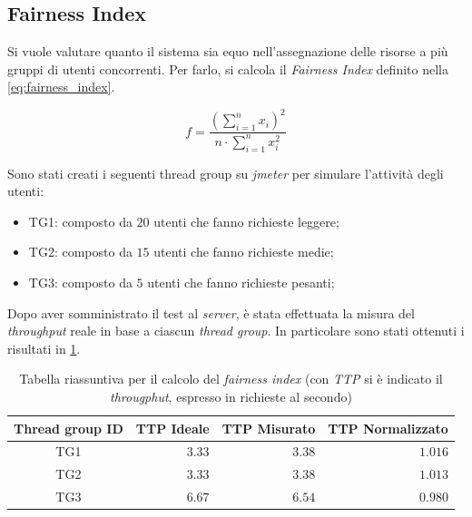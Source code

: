 \clearpage
\subsection{Fairness Index}

Si vuole valutare quanto il sistema sia equo nell'assegnazione delle risorse a più gruppi di utenti concorrenti. 
Per farlo, si calcola il \textit{Fairness Index} definito nella \cref{eq:fairness_index}.

\begin{equation}
    f = \frac{\left(\sum \limits _{i=1}^n x_i\right)^2}{n \cdot \sum \limits _{i=1}^n x_i^2}
    \label{eq:fairness_index}
\end{equation}

Sono stati creati i seguenti thread group su \textit{jmeter} per simulare l'attività degli utenti:

\begin{itemize}
    \item TG1: composto da $20$ utenti che fanno richieste leggere;
    \item TG2: composto da $15$ utenti che fanno richieste medie;
    \item TG3: composto da $5$ utenti che fanno richieste pesanti;  
\end{itemize}

Dopo aver somministrato il test al \textit{server}, è stata effettuata la misura del \textit{throughput} reale in base a ciascun \textit{thread group}. In particolare sono stati ottenuti i risultati in \cref{tab:fairness_results}.

\begin{table}[H]
\centering
    \begin{tabular}{|c|r|r|r|}
    \hline
    \multicolumn{1}{|c|}{\textbf{Thread group ID}} &
    \multicolumn{1}{|c|}{\textbf{TTP Ideale}} &
    \multicolumn{1}{|c|}{\textbf{TTP Misurato}}  &
    \multicolumn{1}{|c|}{\textbf{TTP Normalizzato}}
    \tabularnewline \hline

TG1 & $3.33$ & $3.38$ & $1.016$ \tabularnewline \hline
TG2 & $3.33$ & $3.38$ & $1.013$ \tabularnewline \hline
TG3 & $6.67$ & $6.54$ & $0.980$ \tabularnewline \hline

\end{tabular}
\caption{Tabella riassuntiva per il calcolo del \textit{fairness index} (con \textit{TTP} si è indicato il \textit{througphut}, espresso in richieste al secondo)}

\label{tab:fairness_results}
\end{table}

